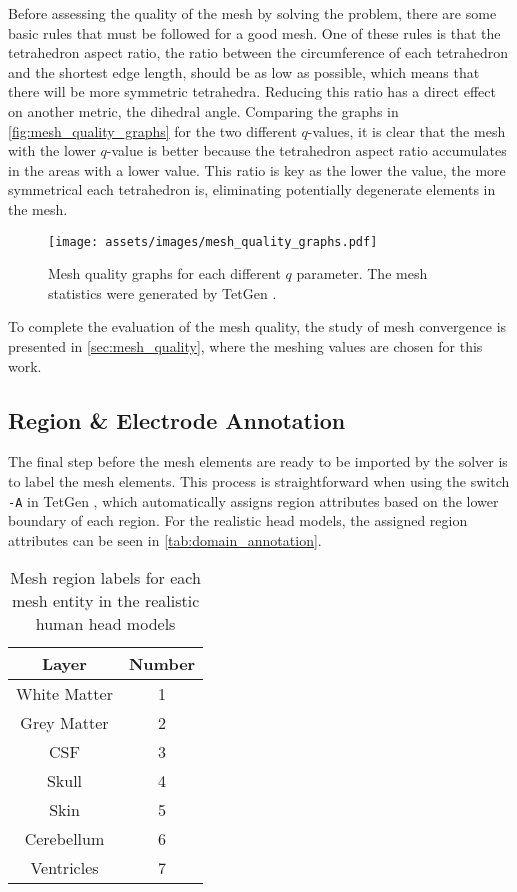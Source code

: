 Before assessing the quality of the mesh by solving the problem, there are some basic rules that must be followed for a good mesh. One of these rules is that the \gls{tetrahedron aspect ratio}, the ratio between the circumference of each tetrahedron and the shortest edge length, should be as low as possible, which means that there will be more symmetric tetrahedra. Reducing this ratio has a direct effect on another metric, the dihedral angle. Comparing the graphs in \autoref{fig:mesh_quality_graphs} for the two different $q$-values, it is clear that the mesh with the lower $q$-value is better because the \gls{tetrahedron aspect ratio} accumulates in the areas with a lower value. This ratio is key as the lower the value, the more symmetrical each tetrahedron is, eliminating potentially degenerate elements in the mesh.

\begin{figure}[H]
    \centering
    \texttt{[image: assets/images/mesh\_quality\_graphs.pdf]}
    \caption[Mesh quality graphs for each different $q$ parameter]{Mesh quality graphs for each different $q$ parameter. The mesh statistics were generated by TetGen \cite{tetgen}.}
    \label{fig:mesh_quality_graphs}
\end{figure}

To complete the evaluation of the mesh quality, the study of mesh convergence is presented in \autoref{sec:mesh_quality}, where the meshing values are chosen for this work.

\subsection{Region \& Electrode Annotation}
\label{subsec:elec_annotation}

The final step before the mesh elements are ready to be imported by the solver is to label the mesh elements. This process is straightforward when using the switch \texttt{-A} in TetGen \cite{tetgen}, which automatically assigns region attributes based on the lower boundary of each region. For the realistic head models, the assigned region attributes can be seen in \autoref{tab:domain_annotation}.

\begin{table}[!ht]
	\centering
	\caption{Mesh region labels for each mesh entity in the realistic human head models}
	\label{tab:domain_annotation}
	\begin{tabular}{|c|c|}
		\hline
		\rowcolor[HTML]{C0C0C0} 
		{\color[HTML]{000000} \textbf{Layer}} & {\color[HTML]{000000} \textbf{Number}} \\ \hline
		White Matter & 1 \\ \hline
		Grey Matter & 2 \\ \hline
		\gls{CSF} & 3 \\ \hline
		Skull & 4 \\ \hline
		Skin & 5 \\ \hline
		Cerebellum & 6 \\ \hline
		Ventricles & 7 \\ \hline
	\end{tabular}
\end{table}

